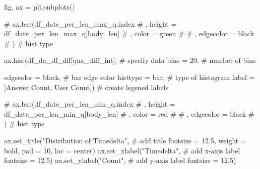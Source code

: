 \documentclass[
  letterpaper,
  DIV=11,
  numbers=noendperiod]{scrartcl}
\newenvironment{Shaded}{\begin{snugshade}}{\end{snugshade}}
\newcommand{\CommentTok}[1]{\textcolor[rgb]{0.37,0.37,0.37}{#1}}
\newcommand{\DecValTok}[1]{\textcolor[rgb]{0.68,0.00,0.00}{#1}}
\newcommand{\FloatTok}[1]{\textcolor[rgb]{0.68,0.00,0.00}{#1}}
\newcommand{\NormalTok}[1]{\textcolor[rgb]{0.00,0.23,0.31}{#1}}
\newcommand{\OperatorTok}[1]{\textcolor[rgb]{0.37,0.37,0.37}{#1}}
\newcommand{\StringTok}[1]{\textcolor[rgb]{0.13,0.47,0.30}{#1}}
\begin{document}
\begin{Shaded}
\begin{Highlighting}[]
\NormalTok{fig, ax }\OperatorTok{=}\NormalTok{ plt.subplots()}


\CommentTok{\# ax.bar(df\_date\_per\_len\_max\_q.index}
\CommentTok{\#     ,  height = df\_date\_per\_len\_max\_q[\textquotesingle{}body\_len\textquotesingle{}]}
\CommentTok{\#     ,  color = \textquotesingle{}green\textquotesingle{}}
\CommentTok{\#     \# ,  edgecolor = \textquotesingle{}black\textquotesingle{}}
\CommentTok{\#       ) \# hist type}

\NormalTok{ax.hist(df\_da\_df\_dff[}\StringTok{\textquotesingle{}qna\_diff\_int\textquotesingle{}}\NormalTok{], }\CommentTok{\# specify data}
\NormalTok{        bins }\OperatorTok{=} \DecValTok{20}\NormalTok{, }\CommentTok{\# number of bins}

\NormalTok{        edgecolor }\OperatorTok{=} \StringTok{\textquotesingle{}black\textquotesingle{}}\NormalTok{, }\CommentTok{\# bar edge color}
\NormalTok{        histtype }\OperatorTok{=} \StringTok{\textquotesingle{}bar\textquotesingle{}}\NormalTok{, }\CommentTok{\# type of histogram}
\NormalTok{        label }\OperatorTok{=}\NormalTok{ [}\StringTok{\textquotesingle{}Answer Count\textquotesingle{}}\NormalTok{, }\StringTok{\textquotesingle{}User Count\textquotesingle{}}\NormalTok{]) }\CommentTok{\# create legened labels}

\CommentTok{\# ax.bar(df\_date\_per\_len\_min\_q.index}
\CommentTok{\#     ,  height = df\_date\_per\_len\_min\_q[\textquotesingle{}body\_len\textquotesingle{}]}
\CommentTok{\#     ,  color = \textquotesingle{}red\textquotesingle{}}
\CommentTok{\#     \# ,  edgecolor = \textquotesingle{}black\textquotesingle{}}
\CommentTok{\#       ) \# hist type}

\NormalTok{ax.set\_title(}\StringTok{"Distribution of Timedelta"}\NormalTok{, }\CommentTok{\# add title}
\NormalTok{             fontsize }\OperatorTok{=} \FloatTok{12.5}\NormalTok{,}
\NormalTok{             weight }\OperatorTok{=} \StringTok{\textquotesingle{}bold\textquotesingle{}}\NormalTok{,}
\NormalTok{             pad }\OperatorTok{=} \DecValTok{10}\NormalTok{,}
\NormalTok{             loc }\OperatorTok{=} \StringTok{\textquotesingle{}center\textquotesingle{}}\NormalTok{)}
\NormalTok{ax.set\_xlabel(}\StringTok{"Timedelta"}\NormalTok{, }\CommentTok{\# add x{-}axis label}
\NormalTok{              fontsize }\OperatorTok{=} \FloatTok{12.5}\NormalTok{)}
\NormalTok{ax.set\_ylabel(}\StringTok{"Count"}\NormalTok{, }\CommentTok{\# add y{-}axis label}
\NormalTok{              fontsize }\OperatorTok{=} \FloatTok{12.5}\NormalTok{)}


\end{Highlighting}
\end{Shaded}
\end{document}
